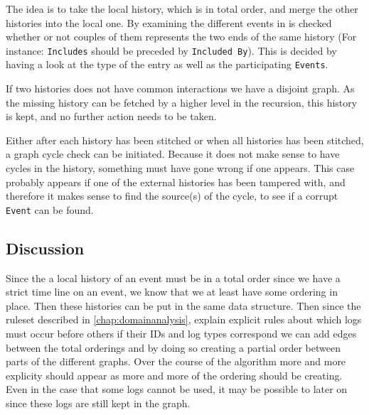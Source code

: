 \newpar The idea is to take the local history, which is in total order, and merge the other histories into the local one. By examining the different events in is checked whether or not couples of them represents the two ends of the same history (For instance: \texttt{Includes} should be preceded by \texttt{Included By}). This is decided by having a look at the type of the entry as well as the participating \texttt{Events}.

\newpar If two histories does not have common interactions we have a disjoint graph. As the missing history can be fetched by a higher level in the recursion, this history is kept, and no further action needs to be taken.

\newpar Either after each history has been stitched or when all histories has been stitched, a graph cycle check can be initiated. Because it does not make sense to have cycles in the history, something must have gone wrong if one appears. This case probably appears if one of the external histories has been tampered with, and therefore it makes sense to find the source(s) of the cycle, to see if a corrupt \texttt{Event} can be found.

\subsection{Discussion} %
Since the a local history of an event must be in a total order since we have a strict time line on an event, we know that we at least have some ordering in place. Then these histories can be put in the same data structure. Then since the ruleset described in \autoref{chap:domainanalysis}, explain explicit rules about which logs must occur before others if their IDs and log types correspond we can add edges between the total orderings and by doing so creating a partial order between parts of the different graphs. Over the course of the algorithm more and more explicity should appear as more and more of the ordering should be creating. Even in the case that some logs cannot be used, it may be possible to later on since these logs are still kept in the graph. %

